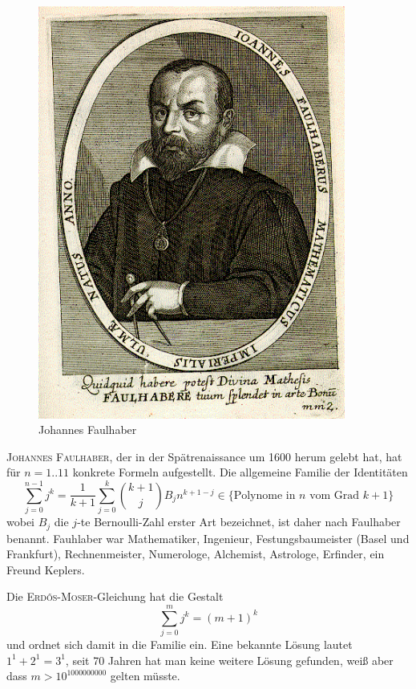 \documentclass[a4paper,11pt,notitlepage,fullpage]{article}
\begin{document}
\begin{enumerate}
\begin{enumerate}
\begin{figure}[h!]
\centering
\includegraphics[width=0.9\textwidth]{gfx/Ioannes-Faulhaberus-Mathematicus-Imperialis-Ulmae-Natus.png}
\caption{Johannes Faulhaber}
\end{figure}

\textsc{Johannes Faulhaber}, der in der Spätrenaissance um 1600 herum gelebt hat, hat für $n=1..11$ konkrete Formeln aufgestellt.
Die allgemeine Familie der Identitäten
$$\sum_{j=0}^{n-1} j^k = \frac{1}{k+1}\sum_{j=0}^k \binom{k+1}{j} B_{j} n^{k+1-j} \in \text{\{Polynome in $n$ vom Grad $k+1$\}}$$
wobei $B_j$ die $j$-te Bernoulli-Zahl erster Art bezeichnet, ist daher nach Faulhaber benannt.
Fauhlaber war Mathematiker, Ingenieur, Festungsbaumeister (Basel und Frankfurt), Rechnenmeister, Numerologe, Alchemist, Astrologe, Erfinder, ein Freund Keplers.


Die \textsc{Erdős}-\textsc{Moser}-Gleichung hat die Gestalt
$$\sum_{j=0}^{m} j^k = (m+1)^k$$
und ordnet sich damit in die Familie ein. Eine bekannte Lösung lautet $1^1+2^1=3^1$, seit 70 Jahren hat man keine weitere Lösung gefunden, weiß aber dass $m>10^{1000000000}$ gelten müsste.


\end{enumerate}
\end{enumerate}
\end{document}
